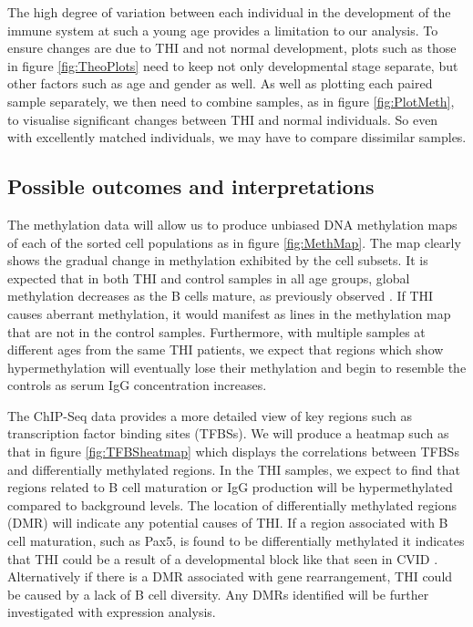 \documentclass[12pt]{article}
\begin{document}
			
			{\scriptsize The high degree of variation between each individual in the development of the immune system at such a young age provides a limitation to our analysis.
			To ensure changes are due to THI and not normal development, plots such as those in figure \ref{fig:TheoPlots} need to keep not only developmental stage separate, but other factors such as age and gender as well. 
			As well as plotting each paired sample separately, we then need to combine samples, as in figure \ref{fig:PlotMeth}, to visualise significant changes between THI and normal individuals.
			So even with excellently matched individuals, we may have to compare dissimilar samples.  }

		\subsection{Possible outcomes and interpretations}

			The methylation data will allow us to produce unbiased DNA methylation maps of each of the sorted cell populations as in figure \ref{fig:MethMap}.
			The map clearly shows the gradual change in methylation exhibited by the cell subsets. 
			It is expected that in both THI and control samples in all age groups, global methylation decreases as the B cells mature, as previously observed \citep{Kulis15,Lai13,Kulis12,Shaknovich11}. 
			If THI causes aberrant methylation, it would manifest as lines in the methylation map that are not in the control samples. 
			Furthermore, with multiple samples at different ages from the same THI patients, we expect that regions which show hypermethylation will eventually lose their methylation and begin to resemble the controls as serum IgG concentration increases.
			
			The ChIP-Seq data provides a more detailed view of key regions such as transcription factor binding sites (TFBSs).
			We will produce a heatmap such as that in figure \ref{fig:TFBSheatmap} which displays the correlations between TFBSs and differentially methylated regions. 
			In the THI samples, we expect to find that regions related to B cell maturation or IgG production will be hypermethylated compared to background levels. 
			The location of differentially methylated regions (DMR) will indicate any potential causes of THI.
			If a region associated with B cell maturation, such as Pax5, is found to be differentially methylated it indicates that THI could be a result of a developmental block like that seen in CVID \citep{Tallmadge15}.
			Alternatively if there is a DMR associated with gene rearrangement, THI could be caused by a lack of B cell diversity.
			Any DMRs identified will be further investigated with expression analysis.
			
\end{document}
